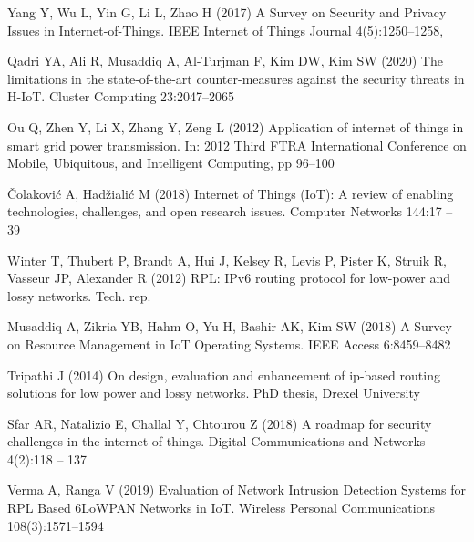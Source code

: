 \documentclass[]{svjour3}                     %
\begin{document}
\begin{thebibliography}{57}
	Yang Y, Wu L, Yin G, Li L, Zhao H (2017) {A Survey on Security and Privacy
		Issues in Internet-of-Things}. IEEE Internet of Things Journal
	4(5):1250--1258, 
	
	Qadri YA, Ali R, Musaddiq A, Al-Turjman F, Kim DW, Kim SW (2020) {The
		limitations in the state-of-the-art counter-measures against the security
		threats in H-IoT}. Cluster Computing 23:2047–2065
	
	Ou Q, Zhen Y, Li X, Zhang Y, Zeng L (2012) Application of internet of things in
	smart grid power transmission. In: 2012 Third FTRA International Conference
	on Mobile, Ubiquitous, and Intelligent Computing, pp 96--100
	
	Čolaković A, Hadžialić M (2018) {Internet of Things (IoT): A review of
		enabling technologies, challenges, and open research issues}. Computer
	Networks 144:17 -- 39
	
	Winter T, Thubert P, Brandt A, Hui J, Kelsey R, Levis P, Pister K, Struik R,
	Vasseur JP, Alexander R (2012) {RPL: IPv6 routing protocol for low-power and
		lossy networks}. Tech. rep.
	
	Musaddiq A, Zikria YB, Hahm O, Yu H, Bashir AK, Kim SW (2018) {A Survey on
		Resource Management in IoT Operating Systems}. IEEE Access 6:8459--8482
	
	Tripathi J (2014) On design, evaluation and enhancement of ip-based routing
	solutions for low power and lossy networks. PhD thesis, Drexel University
	
	Sfar AR, Natalizio E, Challal Y, Chtourou Z (2018) A roadmap for security
	challenges in the internet of things. Digital Communications and Networks
	4(2):118 -- 137
	
	Verma A, Ranga V (2019) {Evaluation of Network Intrusion Detection Systems for
		RPL Based 6LoWPAN Networks in IoT}. Wireless Personal Communications
	108(3):1571--1594
	

\end{thebibliography}
\end{document}
